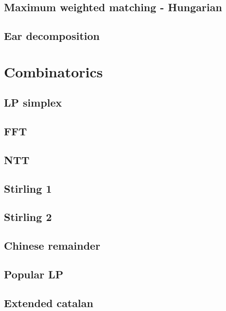 \subsection{Maximum weighted matching - Hungarian}
\raggedbottom
\hrulefill
\subsection{Ear decomposition}
\raggedbottom
\hrulefill

\section{Combinatorics}
\subsection{LP simplex}
\raggedbottom
\hrulefill
\subsection{FFT}
\raggedbottom
\hrulefill
\subsection{NTT}
\raggedbottom
\hrulefill
\subsection{Stirling 1}
\raggedbottom
\hrulefill
\subsection{Stirling 2}

\hrulefill
\subsection{Chinese remainder}
\raggedbottom
\hrulefill
\subsection{Popular LP}

\hrulefill
\subsection{Extended catalan}

\hrulefill
